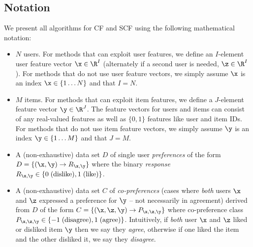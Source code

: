 
\subsection{Notation}

\label{sec:notation}

We present all algorithms for CF and SCF using the following
mathematical notation:
\begin{itemize}
\item $N$ users.  For methods that can exploit user features, we define 
an $I$-element user feature vector 
$\x \in \R^I$ (alternately if a second user is needed, $\z \in \R^I$).
For methods that do not use user feature vectors, we simply assume $\x$
is an index $\x \in \{ 1 \ldots N \}$ and that $I=N$.

\item $M$ items.  For methods that can exploit item features, we define
a $J$-element feature vector 
$\y \in \R^J$. The feature vectors for users 
and items can consist of any real-valued features as well as $\{0,1\}$
features like user and item IDs.
For methods that do not use item feature vectors, we simply assume $\y$
is an index $\y \in \{ 1 \ldots M \}$ and that $J=M$.

\item A (non-exhaustive) data set $D$ of single user \emph{preferences} of the form
$D = \{ (\x, \y) \to R_{\x,\y} \}$ where 
the binary \emph{response} 
$R_{\x,\y} \in \{ 0 \; \mbox{(dislike)}, 1 \; \mbox{(like)} \}$.

\item A (non-exhaustive) data set $C$ of \emph{co-preferences} (cases where
\emph{both} users $\x$ and $\z$ expressed a preference for $\y$ -- not
necessarily in agreement) derived from $D$ of the form
$C = \{ (\x, \z, \y) \to P_{\x, \z, \y} \}$ where co-preference class 
$P_{\x, \z, \y} \in \{ -1 \; \mbox{(disagree)}, 1 \;\mbox{(agree)} \}$.  
Intuitively, if \emph{both} user $\x$ and $\z$ liked or disliked item 
$\y$ then we say they \emph{agree}, otherwise if one liked the item and
the other disliked it, we say they \emph{disagree}.


\end{itemize}
